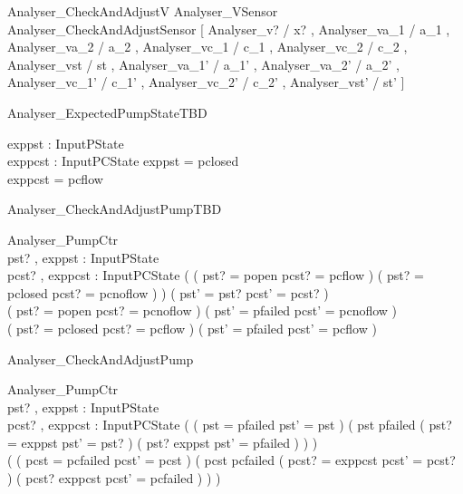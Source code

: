 \documentclass{article}
\begin{document}
\begin{zed}
	Analyser\_CheckAndAdjustV  Analyser\_VSensor \land Analyser\_CheckAndAdjustSensor [ Analyser\_v? / x? , Analyser\_va\_1 / a\_1 , Analyser\_va\_2 / a\_2 , Analyser\_vc\_1 / c\_1 , Analyser\_vc\_2 / c\_2 , Analyser\_vst / st , Analyser\_va\_1' / a\_1' , Analyser\_va\_2' / a\_2' , Analyser\_vc\_1' / c\_1' , Analyser\_vc\_2' / c\_2' , Analyser\_vst' / st' ]
\end{zed}

\begin{schema}{Analyser\_ExpectedPumpStateTBD}

 exppst : InputPState \\
 exppcst : InputPCState 
\where
 exppst = pclosed \\
 exppcst = pcflow
\end{schema}

\begin{schema}{Analyser\_CheckAndAdjustPumpTBD}

 \Delta Analyser\_PumpCtr \\
 pst? , exppst : InputPState \\
 pcst? , exppcst : InputPCState 
\where
 ( ( pst? = popen \land pcst? = pcflow ) \lor ( pst? = pclosed \land pcst? = pcnoflow ) ) \implies ( pst' = pst? \land pcst' = pcst? ) \\
 ( pst? = popen \land pcst? = pcnoflow ) \implies ( pst' = pfailed \land pcst' = pcnoflow ) \\
 ( pst? = pclosed \land pcst? = pcflow ) \implies ( pst' = pfailed \land pcst' = pcflow )
\end{schema}

\begin{schema}{Analyser\_CheckAndAdjustPump}

 \Delta Analyser\_PumpCtr \\
 pst? , exppst : InputPState \\
 pcst? , exppcst : InputPCState 
\where
 ( ( pst = pfailed \land pst' = pst ) \lor ( pst \neq pfailed \land ( pst? = exppst \implies pst' = pst? ) \land ( pst? \neq exppst \implies pst' = pfailed ) ) ) \\
 ( ( pcst = pcfailed \land pcst' = pcst ) \lor ( pcst \neq pcfailed \land ( pcst? = exppcst \implies pcst' = pcst? ) \land ( pcst? \neq exppcst \implies pcst' = pcfailed ) ) )
\end{schema}
\end{document}
